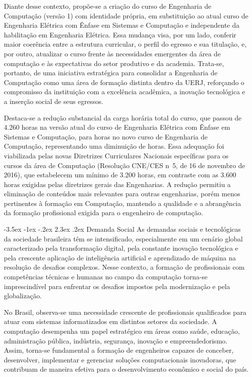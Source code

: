 \documentclass[12pt,a4paper]{article}
\makeatletter
\renewcommand{\section}{\@startsection{section}{1}{\z@}%
      {-3.5ex \@plus -1ex \@minus -.2ex}%
      {2.3ex \@plus.2ex}%
      {\normalfont\normalsize\bfseries}}
\makeatother
\begin{document}
Diante desse contexto, propõe-se a criação do curso de Engenharia de Computação (versão 1) com identidade própria, em substituição ao atual curso de Engenharia Elétrica com Ênfase em Sistemas e Computação e independente da habilitação em Engenharia Elétrica. Essa mudança visa, por um lado, conferir maior coerência entre a estrutura curricular, o perfil do egresso e sua titulação, e, por outro, atualizar o curso frente às necessidades emergentes da área de computação e às expectativas do setor produtivo e da academia. Trata-se, portanto, de uma iniciativa estratégica para consolidar a Engenharia de Computação como uma área de formação distinta dentro da UERJ, reforçando o compromisso da instituição com a excelência acadêmica, a inovação tecnológica e a inserção social de seus egressos.

Destaca-se a redução substancial da carga horária total do curso, que passou de 4.260 horas na versão atual do curso de Engenharia Elétrica com Ênfase em Sistemas e Computação, para \tHorasCurso horas no novo curso de Engenharia de Computação, representando uma diminuição de  horas. Essa adequação foi viabilizada pelas novas Diretrizes Curriculares Nacionais específicas para os cursos da área de Computação (Resolução CNE/CES n\textordmasculine{}~5, de 16 de novembro de 2016), que estabelecem um mínimo de 3.200 horas, em contraste com as 3.600 horas exigidas pelas diretrizes gerais das Engenharias. A redução permitiu a eliminação de conteúdos mais relevantes para outras engenharias, porém menos pertinentes à formação em Computação, mantendo a qualidade e a abrangência da formação profissional exigida para o engenheiro de computação.

\section{Demanda Social}
As demandas sociais e tecnológicas da sociedade brasileira têm se intensificado, especialmente em um cenário global caracterizado pela transformação digital, pela constante inovação tecnológica e pela crescente aplicação de inteligência artificial e aprendizado de máquina na resolução de desafios complexos. Nesse contexto, a formação de profissionais com competências técnicas e humanas no campo da computação torna-se imprescindível para enfrentar os desafios impostos pela modernização e pela globalização.

No Brasil, observa-se uma necessidade crescente de profissionais qualificados para atuar com sistemas informatizados em distintos setores da sociedade. A computação desempenha um papel estratégico em áreas como saúde, educação, administração pública, indústria, segurança, inovação e empreendedorismo. Assim, torna-se fundamental a formação de engenheiros capazes de conceber, desenvolver, implementar e gerenciar soluções computacionais inovadoras, que contribuam de maneira efetiva para o desenvolvimento econômico e social do país.
\end{document}
